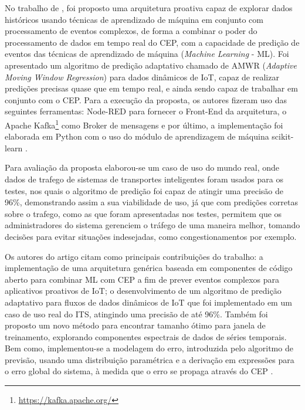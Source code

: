 \documentclass[ti,table]{texufpel} %
\begin{document}
     No trabalho de \cite{art4akbar2017predictive}, foi proposto uma arquitetura proativa capaz de explorar dados históricos usando técnicas de aprendizado de máquina em conjunto com processamento de eventos complexos, de forma a combinar o poder do processamento de dados em tempo real do CEP, com a capacidade de predição de eventos das técnicas de aprendizado de máquina (\textit{Machine Learning} - ML). Foi apresentado um algoritmo de predição adaptativo chamado de AMWR (\textit{Adaptive Moving Window Regression}) para dados dinâmicos de IoT, capaz de realizar predições precisas quase que em tempo real, e ainda sendo capaz de trabalhar em conjunto com o CEP. Para a execução da proposta, os autores fizeram uso das seguintes ferramentas: Node-RED para fornecer o Front-End da arquitetura, o Apache Kafka\footnote{\url{https://kafka.apache.org/}} como Broker de mensagens e por último, a implementação foi elaborada em Python com o uso do módulo de aprendizagem de máquina scikit-learn .   

      

     Para avaliação da proposta elaborou-se um caso de uso do mundo real, onde dados de trafego de sistemas de transportes inteligentes foram usados para os testes, nos quais o algoritmo de predição foi capaz de atingir uma precisão de 96\%, demonstrando assim a sua viabilidade de uso, já que com predições corretas sobre o trafego, como as que foram apresentadas nos testes, permitem que os administradores do sistema gerenciem o tráfego de uma maneira melhor, tomando decisões para evitar situações indesejadas, como congestionamentos por exemplo.      

     Os autores do artigo citam como principais contribuições do trabalho: a implementação de uma arquitetura genérica baseada em componentes de código aberto para combinar ML com CEP a fim de prever eventos complexos para aplicativos proativos de IoT; o desenvolvimento de um algoritmo de predição adaptativo para fluxos de dados dinâmicos de IoT que foi implementado em um caso de uso real do ITS, atingindo uma precisão de até 96\%. Também foi proposto um novo método para encontrar tamanho ótimo para janela de treinamento, explorando componentes espectrais de dados de séries temporais. Bem como, implementou-se a modelagem do erro, introduzida pelo algoritmo de previsão, usando uma distribuição paramétrica e a derivação em expressões para o erro global do sistema, à medida que o erro se propaga através do CEP \cite{art4akbar2017predictive}. 

  
\end{document}
